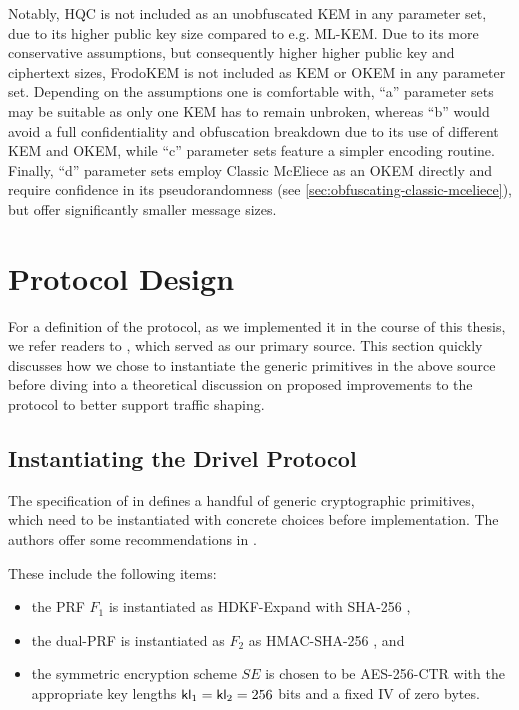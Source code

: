 Notably, HQC is not included as an unobfuscated KEM in any parameter set, due to its higher public key size compared to e.g. ML-KEM. Due to its more conservative assumptions, but consequently higher higher public key and ciphertext sizes, FrodoKEM is not included as KEM or OKEM in any parameter set. Depending on the assumptions one is comfortable with, ``a'' parameter sets may be suitable as only one KEM has to remain unbroken, whereas ``b'' would avoid a full confidentiality and obfuscation breakdown due to its use of different KEM and OKEM, while ``c'' parameter sets feature a simpler encoding routine. Finally, ``d'' parameter sets employ Classic McEliece as an OKEM directly and require confidence in its pseudorandomness (see \cref{sec:obfuscating-classic-mceliece}), but offer significantly smaller message sizes.

\section{Protocol Design} \label{sec:protocol-design}

For a definition of the \drivel{} protocol, as we implemented it in the course of this thesis, we refer readers to \cite[Figure~6]{EPRINT:GRSV25}, which served as our primary source.
This section quickly discusses how we chose to instantiate the generic primitives in the above source before diving into a theoretical discussion on proposed improvements to the protocol to better support traffic shaping.

\subsection{Instantiating the Drivel Protocol} \label{ssec:drivel-instance}

The specification of \drivel{} in \cite[Figure~6]{EPRINT:GRSV25} defines a handful of generic cryptographic primitives, which need to be instantiated with concrete choices before implementation.
The authors offer some recommendations in \cite[Section~4.2]{EPRINT:GRSV25}.

These include the following items:
\begin{itemize}
    \item the PRF $F_1$ is instantiated as \textsf{HDKF-Expand} with \textsf{SHA-256} \cite{C:Krawczyk10,rfc5869},
    
    \item the dual-PRF is instantiated as $F_2$ as \textsf{HMAC-SHA-256} \cite{C:BelCanKra96,KraBelCan97}, and
    
    \item the symmetric encryption scheme $SE$ is chosen to be \textsf{AES-256-CTR} with the appropriate key lengths $\mathsf{kl}_1 = \mathsf{kl}_2 = 256$ bits and a fixed IV of zero bytes.
\end{itemize}

